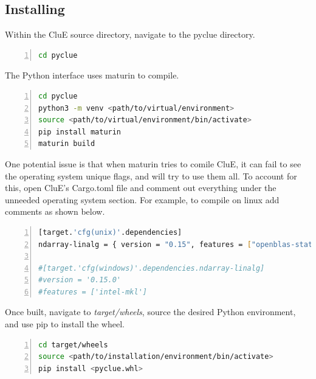 \documentclass{book}
\begin{document}
\subsection{Installing}
Within the CluE source directory, navigate to the pyclue directory.
\begin{lstlisting}[frame=single,numbers=left,language=bash]
cd pyclue
\end{lstlisting}
The Python interface uses maturin\cite{maturin} to compile.
\begin{lstlisting}[frame=single,numbers=left,language=bash]
cd pyclue
python3 -m venv <path/to/virtual/environment>
source <path/to/virtual/environment/bin/activate>
pip install maturin
maturin build
\end{lstlisting}
One potential issue is that when maturin tries to comile CluE, 
it can fail to see the operating system unique flags, and will try to use them
all.  To account for this, open CluE's Cargo.toml file and comment out 
everything under the unneeded operating system section.  
For example, to compile on linux add comments as shown below.
\begin{lstlisting}[frame=single,numbers=left,language=bash]
[target.'cfg(unix)'.dependencies]
ndarray-linalg = { version = "0.15", features = ["openblas-static"] }

#[target.'cfg(windows)'.dependencies.ndarray-linalg]
#version = '0.15.0'
#features = ['intel-mkl']
\end{lstlisting}
Once built, navigate to \textit{target/wheels}, source the desired
Python environment, and use pip to install the wheel.
\begin{lstlisting}[frame=single,numbers=left,language=bash]
cd target/wheels
source <path/to/installation/environment/bin/activate>
pip install <pyclue.whl>
\end{lstlisting}
\end{document}
